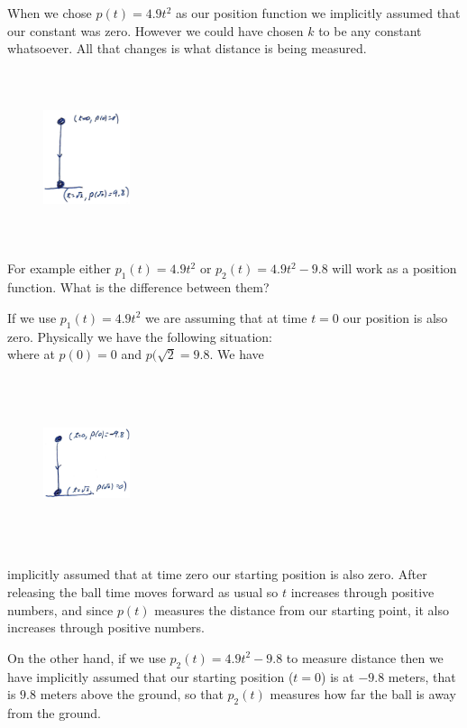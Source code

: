 When we chose $p(t)=4.9t^2$ as our position function we implicitly
assumed that our constant was zero. However we could have chosen $k$
to be any constant whatsoever. All that changes is what distance is being measured. 


\begin{figure}
\captionsetup{labelformat=empty}
\includegraphics*[height=2in,width=1in]{Figures-HandDrawn/FallingBall1}
\label{fig:FallingBall1}
\end{figure}
For example either $p_1(t) =4.9t^2$ or $p_2(t)=4.9t^2-9.8$ will work
as a position function. What is the difference between them?

If we use $p_1(t) = 4.9t^2$ we are assuming that at time $t=0$ our
position is also zero. Physically we have the following situation:\\
where at $p(0) =0$ and $p(\sqrt{2}=9.8.$ We have
\begin{figure}
\captionsetup{labelformat=empty}
\includegraphics*[height=2in,width=1in]{Figures-HandDrawn/FallingBall2}
\label{fig:FallingBall2}
\end{figure}
implicitly assumed that at time zero our starting position is also
zero. After releasing the ball time moves forward as usual so $t$
increases through positive numbers, and since $p(t)$ measures the
distance from our starting point, it also increases through positive
numbers.

On the other hand, if we use $p_2(t)=4.9t^2-9.8$ to measure distance
then 
we have implicitly assumed that our starting position ($t=0$) is
at $-9.8$ meters, that is $9.8$ meters above the ground, so that
$p_2(t)$ measures how far the ball is away from the ground. 


